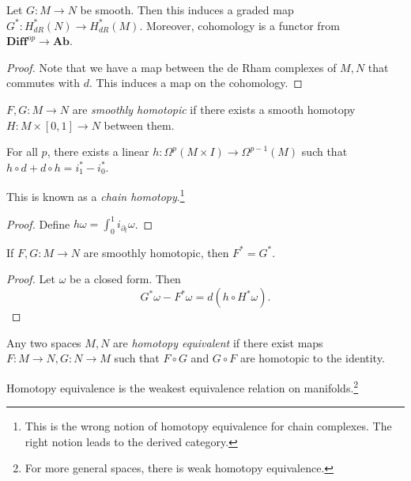 \documentclass[twoside, 10pt]{article}
\begin{document}
    \begin{prop}
        Let $G:M \to N$ be smooth. Then this induces a graded map $G^*: H^*_{dR}(N) \to H^*_{dR}(M)$. Moreover, cohomology is a functor from $\mathbf{Diff}^{op} \to \mathbf{Ab}$.
    \end{prop}

    \begin{proof}
         Note that we have a map between the de Rham complexes of $M, N$ that commutes with $d$. This induces a map on the cohomology.
    \end{proof}

    \begin{defn}
        $F,G:M \to N$ are \textit{smoothly homotopic} if there exists a smooth homotopy $H:M \times [0,1] \to N$ between them.
    \end{defn}

    \begin{lem}
        For all $p$, there exists a linear $h: \Omega^p(M \times I) \to \Omega^{p-1}(M)$ such that $h \circ d + d \circ h = i_1^* - i_0^*$.
    \end{lem}

    \begin{rmk}
        This is known as a \textit{chain homotopy}.\footnote{This is the wrong notion of homotopy equivalence for chain complexes. The right notion leads to the derived category.}
    \end{rmk}

    \begin{proof}
        Define $h \omega = \int_0^1 i_{\partial_t} \omega$.
    \end{proof}

    \begin{thm}
        If $F,G:M \to N$ are smoothly homotopic, then $F^* = G^*$.
    \end{thm}

    \begin{proof}
        Let $\omega$ be a closed form. Then
        \[ G^*\omega - F^*\omega = d(h\circ H^*\omega).\]
    \end{proof}

    \begin{defn}
        Any two spaces $M,N$ are \textit{homotopy equivalent} if there exist maps $F:M \to N, G:N \to M$ such that $F \circ G$ and $G \circ F$ are homotopic to the identity.
    \end{defn}

    \begin{rmk}
        Homotopy equivalence is the weakest equivalence relation on manifolds.\footnote{For more general spaces, there is weak homotopy equivalence.}
    \end{rmk}
\end{document}
